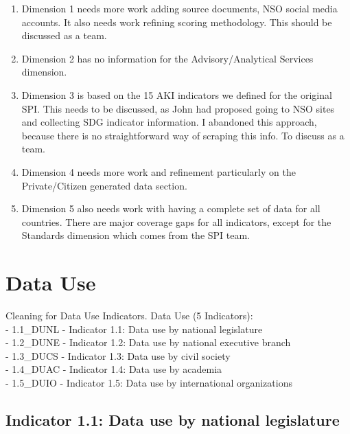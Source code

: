 \documentclass[]{article}
\providecommand{\tightlist}{%
  \setlength{\itemsep}{0pt}\setlength{\parskip}{0pt}}
\begin{document}
\begin{enumerate}
\def\labelenumi{\arabic{enumi}.}
\tightlist
\item
  Dimension 1 needs more work adding source documents, NSO social media
  accounts. It also needs work refining scoring methodology. This should
  be discussed as a team.\\
\item
  Dimension 2 has no information for the Advisory/Analytical Services
  dimension.
\item
  Dimension 3 is based on the 15 AKI indicators we defined for the
  original SPI. This needs to be discussed, as John had proposed going
  to NSO sites and collecting SDG indicator information. I abandoned
  this approach, because there is no straightforward way of scraping
  this info. To discuss as a team.\\
\item
  Dimension 4 needs more work and refinement particularly on the
  Private/Citizen generated data section.\\
\item
  Dimension 5 also needs work with having a complete set of data for all
  countries. There are major coverage gaps for all indicators, except
  for the Standards dimension which comes from the SPI team.
\end{enumerate}

\hypertarget{data-use}{%
\section{Data Use}\label{data-use}}

Cleaning for Data Use Indicators. Data Use (5 Indicators):\\
- 1.1\_DUNL - Indicator 1.1: Data use by national legislature\\
- 1.2\_DUNE - Indicator 1.2: Data use by national executive branch\\
- 1.3\_DUCS - Indicator 1.3: Data use by civil society\\
- 1.4\_DUAC - Indicator 1.4: Data use by academia\\
- 1.5\_DUIO - Indicator 1.5: Data use by international organizations

\hypertarget{indicator-1.1-data-use-by-national-legislature}{%
\subsection{Indicator 1.1: Data use by national
legislature}\label{indicator-1.1-data-use-by-national-legislature}}
\end{document}
